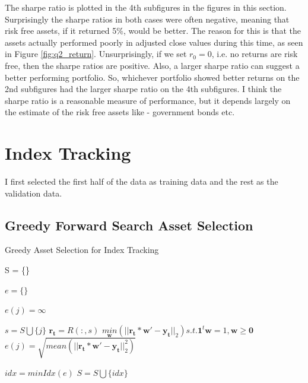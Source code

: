 \documentclass[11pt]{article}
\begin{document}
The sharpe ratio is plotted in the 4th subfigures in the figures in this section. Surprisingly the sharpe
ratios in both cases were often negative, meaning that risk free assets, if it returned 5\%, would be better.
The reason for this is that the assets actually performed poorly in adjusted close values during this
time, as seen in Figure \ref{fig:q2_return}. Unsurprisingly, if we set $r_0 = 0$, i.e. no returns are risk free,
then the sharpe ratios are positive. Also, a larger sharpe ratio can suggest a better performing portfolio. So, whichever portfolio showed
better returns on the 2nd subfigures had the larger sharpe ratio on the 4th subfigures. I think the sharpe ratio
is a reasonable measure of performance, but it depends largely on the estimate of the risk free assets like -
government bonds etc.

\section{Index Tracking}

I first selected the first half of the data as training data and the rest as the validation data.

\subsection{Greedy Forward Search Asset Selection}

\begin{algorithm}[H]
\caption{Greedy Asset Selection for Index Tracking}
\label{alg:greedy-index}
\begin{algorithmic}

\State S = \{\}


\State $e = \{\}$



\State $e(j) = \infty$

\Else

\State $s = S \bigcup \{j\}$
\State $\bm{r_t} = R(:, s)$
\State $\underset{\bm{w}}{min}(||\bm{r_t} * \bm{w}' - \bm{y_t}||_2) s.t. \bm{1}^t\bm{w} = 1, \bm{w} \geq \bm{0}$
\State $e(j) = \sqrt{mean(||\bm{r_t} * \bm{w}' - \bm{y_t}||_2^2)}$

\EndIf

\EndFor

\State $idx = minIdx(e)$
\State $S = S \bigcup \{idx\}$

\EndFor

\end{algorithmic}

\end{algorithm}
\end{document}
